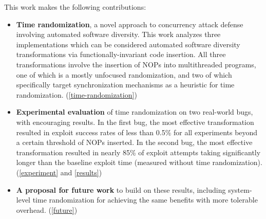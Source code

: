 This work makes the following contributions:
\begin{itemize}
	\item \textbf{Time randomization}, a novel approach to concurrency attack defense involving automated software diversity.
	This work analyzes three implementations which can be considered automated software diversity transformations via functionally-invariant code insertion.
	All three transformations involve the insertion of NOPs into multithreaded programs, one of which is a mostly unfocused randomization, and two of which specifically target synchronization mechanisms as a heuristic for time randomization.
	(\autoref{time-randomization})
	\item \textbf{Experimental evaluation} of time randomization on two real-world bugs, with encouraging results.
	In the first bug, the most effective transformation resulted in exploit success rates of less than 0.5\% for all experiments beyond a certain threshold of NOPs inserted.
	In the second bug, the most effective transformation resulted in nearly 85\% of exploit attempts taking significantly longer than the baseline exploit time (measured without time randomization).
	(\autoref{experiment} and \autoref{results})
	\item \textbf{A proposal for future work} to build on these results,
	  including system-level time randomization for achieving the same benefits with more tolerable overhead.
	(\autoref{future})
\end{itemize}
